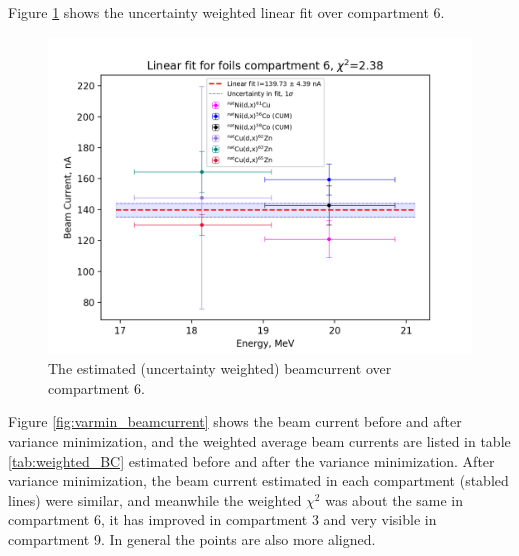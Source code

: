 Figure \ref{fig:BC_comp6} shows the uncertainty weighted linear fit over compartment 6. 

\begin{figure}
    \centering
    \includegraphics{Analysis/Compartment_6.png}
    \caption{The estimated (uncertainty weighted) beamcurrent over compartment 6. }
    \label{fig:BC_comp6}
\end{figure}

Figure \ref{fig:varmin_beamcurrent} shows the beam current before and after variance minimization, and the weighted average beam currents are listed in table \ref{tab:weighted_BC} estimated before and after the variance minimization. After variance minimization, the beam current estimated in each compartment (stabled lines) were similar, and meanwhile the weighted $\chi^2$ was about the same in compartment 6, it has improved in compartment 3 and very visible in compartment 9. In general the points are also more aligned. 

